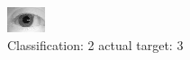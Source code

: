 \begin{figure}[h!]
\begin{center}
\includegraphics[width=0.60\columnwidth]{figures/ID1055_class_2_target_3.png}
\end{center}
\caption{ Classification: 2 actual target: 3}
\label{fig:ID1055_class_2_target_3}
\end{figure}
